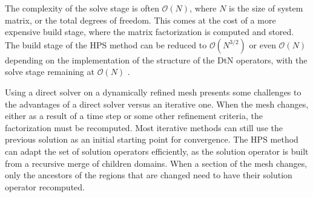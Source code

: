 The complexity of the solve stage is often $\mathcal{O}(N)$, where $N$ is the size of system matrix, or the total degrees of freedom. This comes at the cost of a more expensive build stage, where the matrix factorization is computed and stored. The build stage of the HPS method can be reduced to $\mathcal{O}(N^{3/2})$ or even $\mathcal{O}(N)$ depending on the implementation of the structure of the DtN operators, with the solve stage remaining at $\mathcal{O}(N)$ \cite{gillman2014direct}. 

Using a direct solver on a dynamically refined mesh presents some challenges to the advantages of a direct solver versus an iterative one. When the mesh changes, either as a result of a time step or some other refinement criteria, the factorization must be recomputed. Most iterative methods can still use the previous solution as an initial starting point for convergence. The HPS method can adapt the set of solution operators efficiently, as the solution operator is built from a recursive merge of children domains. When a section of the mesh changes, only the ancestors of the regions that are changed need to have their solution operator recomputed.